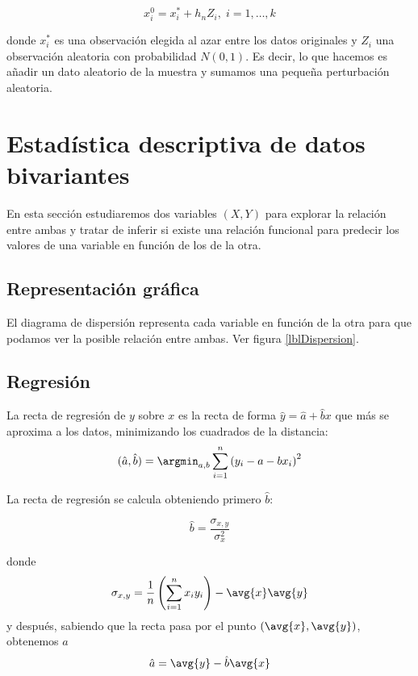 \documentclass{apuntes}
\begin{document}
\[ x_i^0 = x_i^* + h_n Z_i,\; i=1,\dotsc, k \]

donde $x_i^*$ es una observación elegida al azar entre los datos originales y $Z_i$ una observación aleatoria con probabilidad $N(0,1)$. Es decir, lo que hacemos es añadir un dato aleatorio de la muestra y sumamos una pequeña perturbación aleatoria.

\section{Estadística descriptiva de datos bivariantes}

En esta sección estudiaremos dos variables $(X, Y)$ para explorar la relación entre ambas y tratar de inferir si existe una relación funcional para predecir los valores de una variable en función de los de la otra.

\subsection{Representación gráfica}

\begin{defn}
El diagrama de dispersión representa cada variable en función de la otra para que podamos ver la posible relación entre ambas. Ver figura \ref{lblDispersion}.

\end{defn} 

\subsection{Regresión}

\begin{defn}

La recta de regresión de $y$ sobre $x$ es la recta de forma $\hat{y} = \hat{a} + \hat{b}x$ que más se aproxima a los datos, minimizando los cuadrados de la distancia: \[ (\hat{a},\hat{b}) =\argmin_{a, b} \sum_{i=1}^n\left(y_i - a - bx_i\right)^2 \]
\end{defn}

La recta de regresión se calcula obteniendo primero $\hat{b}$:

\[ \hat{b} = \frac{\sigma_{x,y}}{\sigma^2_x} \]

donde \[ \sigma_{x,y} = \frac{1}{n} \left( \sum_{i=1}^n x_i y_i\right)  - \avg{x}\avg{y} \] y después, sabiendo que la recta pasa por el punto $(\avg{x}, \avg{y})$, obtenemos $\hat{a}$ \[ \hat{a} = \avg{y} - \hat{b}\avg{x} \]
\end{document}
